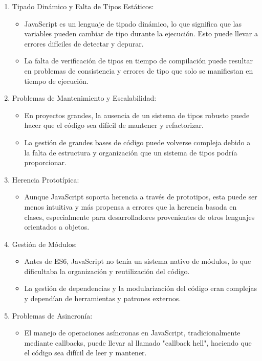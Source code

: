 \documentclass{article}
\begin{document}
\begin{enumerate}
      \item Tipado Dinámico y Falta de Tipos Estáticos:
            \begin{itemize}
                  \item JavaScript es un lenguaje de tipado dinámico, lo que significa que las variables pueden cambiar de
                        tipo durante la ejecución. Esto puede llevar a errores difíciles de detectar y depurar.
                  \item La falta de verificación de tipos en tiempo de compilación puede resultar en problemas de
                        consistencia y errores de tipo que solo se manifiestan en tiempo de ejecución.
            \end{itemize}
      \item Problemas de Mantenimiento y Escalabilidad:
            \begin{itemize}
                  \item En proyectos grandes, la ausencia de un sistema de tipos robusto puede hacer que el código sea
                        difícil de mantener y refactorizar.
                  \item La gestión de grandes bases de código puede volverse compleja debido a la falta de estructura y
                        organización que un sistema de tipos podría proporcionar.
            \end{itemize}
      \item Herencia Prototípica:
            \begin{itemize}
                  \item Aunque JavaScript soporta herencia a través de prototipos, esta puede ser menos intuitiva y más
                        propensa a errores que la herencia basada en clases, especialmente para desarrolladores
                        provenientes de otros lenguajes orientados a objetos.
            \end{itemize}
      \item Gestión de Módulos:
            \begin{itemize}
                  \item Antes de ES6, JavaScript no tenía un sistema nativo de módulos, lo que dificultaba la
                        organización y reutilización del código.
                  \item La gestión de dependencias y la modularización del código eran complejas y dependían de
                        herramientas y patrones externos.
            \end{itemize}
      \item Problemas de Asincronía:
            \begin{itemize}
                  \item El manejo de operaciones asíncronas en JavaScript, tradicionalmente mediante callbacks, puede
                        llevar al llamado "callback hell", haciendo que el código sea difícil de leer y mantener.
            \end{itemize}
\end{enumerate}
\end{document}

